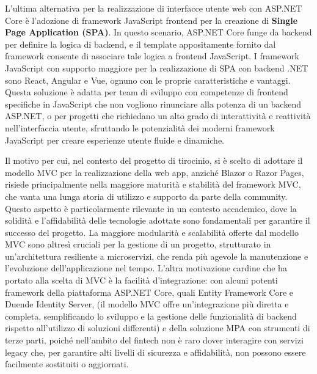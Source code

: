L'ultima alternativa per la realizzazione di interfacce utente web con ASP.NET Core è l'adozione di framework JavaScript frontend per la creazione di \textbf{Single Page Application (SPA)}.
In questo scenario, ASP.NET Core funge da backend per definire la logica di backend, e il template appositamente fornito dal framework consente di associare tale logica a frontend JavaScript. I framework JavaScript con supporto maggiore per la realizzazione di SPA con backend .NET sono React, Angular e Vue, ognuno con le proprie caratteristiche e vantaggi.
Questa soluzione è adatta per team di sviluppo con competenze di frontend specifiche in JavaScript che non vogliono rinunciare alla potenza di un backend ASP.NET, o per progetti che richiedano un alto grado di interattività e reattività nell'interfaccia utente, sfruttando le potenzialità dei moderni framework JavaScript per creare esperienze utente fluide e dinamiche.

Il motivo per cui, nel contesto del progetto di tirocinio, si è scelto di adottare il modello MVC per la realizzazione della web app, anziché Blazor o Razor Pages, risiede principalmente nella maggiore maturità e stabilità del framework MVC, che vanta una lunga storia di utilizzo e supporto da parte della community. Questo aspetto è particolarmente rilevante in un contesto accademico, dove la solidità e l'affidabilità delle tecnologie adottate sono fondamentali per garantire il successo del progetto.
La maggiore modularità e scalabilità offerte dal modello MVC sono altresì cruciali per la gestione di un progetto, strutturato in un'architettura resiliente a microservizi, che renda più agevole la manutenzione e l'evoluzione dell'applicazione nel tempo.
L'altra motivazione cardine che ha portato alla scelta di MVC è la facilità d'integrazione: con alcuni potenti framework della piattaforma ASP.NET Core, quali Entity Framework Core e Duende Identity Server, (il modello MVC offre un'integrazione più diretta e completa, semplificando lo sviluppo e la gestione delle funzionalità di backend rispetto all'utilizzo di soluzioni differenti) e della soluzione MPA con strumenti di terze parti, poiché nell'ambito del fintech non è raro dover interagire con servizi legacy che, per garantire alti livelli di sicurezza e affidabilità, non possono essere facilmente sostituiti o aggiornati.

